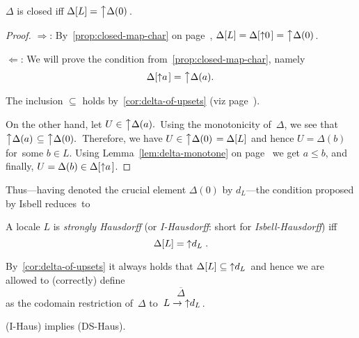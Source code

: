 \begin{lem}
  $\Delta$ is closed iff $\Delta[L] = \left\uparrow \Delta(0)\right.$.
\end{lem}
\begin{proof}
  $\Rightarrow$:
  By~\ref{prop:closed-map-char} on
  page~\pageref{prop:closed-map-char}\thinspace, $\Delta[L] =
  \Delta[\left\uparrow 0 \right.] = \left\uparrow \Delta(0)\right.$.

  $\Leftarrow$:
  We will prove the condition from~\ref{prop:closed-map-char}\thinspace, namely
  \[
    \Delta[ \left\uparrow a\right. ] = \left\uparrow \Delta(a).\right.
  \]

  The inclusion $\subseteq$ holds by~\ref{cor:delta-of-upsets} (viz
  page~\pageref{cor:delta-of-upsets}\thinspace).

  On the other hand, let $U\in \left\uparrow \Delta(a).\right.$
  Using the monotonicity of~$\Delta$, we see that $\left\uparrow
  \Delta(a)\right. \subseteq \left\uparrow \Delta(0).\right.$
  Therefore, we have $U\in \left\uparrow \Delta(0)\right. = \Delta[L]$ and
  hence $U = \Delta(b)$ for~some $b\in L$.
  Using Lemma~\ref{lem:delta-monotone} on page~\pageref{lem:delta-monotone} we
  get $a \le b$, and finally, $U = \Delta(b) \in \Delta[ \left\uparrow a\right.
  ]$.
\end{proof}

Thus---having denoted the crucial element $\Delta(0)$ by $d_L$---the condition
proposed by Isbell reduces~to

\begin{framed}
  \begin{df}[I-Haus]
    A locale $L$ is \emph{strongly Hausdorff\/} (or \emph{I-Hausdorff}: short
    for \emph{Isbell-Hausdorff}) iff
    \[
      \Delta[L] = \left\uparrow d_L \right..
    \]
  \end{df}
\end{framed}

\begin{rem} \label{rem:delta-restriction}
  By~\ref{cor:delta-of-upsets} it always holds that $\Delta[L] \subseteq \left\uparrow d_L \right.$
  and hence we are allowed to (correctly) define
  \[
    \overline{\Delta}
  \]
  as the codomain restriction of~$\Delta$ to~$L \to \left\uparrow d_L \right.$.
\end{rem}

\begin{thm} \label{IHaus->DSHaus}
  (I-Haus) implies (DS-Haus).
\end{thm}

